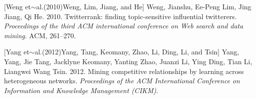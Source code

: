 \documentclass{article} %
\begin{document}
\noindent 

[Weng et$\sim$al.(2010)Weng, Lim, Jiang, and He]  Weng, Jianshu, Ee-Peng Lim, Jing Jiang, Qi He. 2010.    Twitterrank: finding topic-sensitive influential twitterers.    \textit{ Proceedings of the third ACM international conference on Web search and data mining}. ACM, 261--270.

\noindent 

[Yang et$\sim$al.(2012)Yang, Tang, Keomany, Zhao, Li, Ding, Li, and Tsin]  Yang, Yang, Jie Tang, Jacklyne Keomany, Yanting Zhao, Juanzi Li, Ying Ding, Tian Li, Liangwei Wang Tsin. 2012.    Mining competitive relationships by learning across heterogeneous networks.    \textit{ Proceedings of the ACM International Conference on Information and Knowledge Management (CIKM)}.







\noindent 
\end{document}

